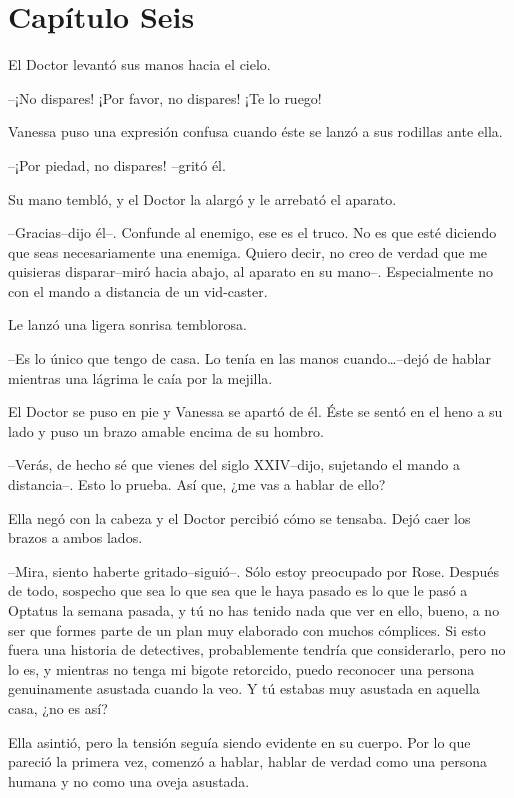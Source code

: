 \chapter*{Capítulo Seis}

El Doctor levantó sus manos hacia el cielo.

--¡No dispares! ¡Por favor, no dispares! ¡Te lo ruego!

Vanessa puso una expresión confusa cuando éste se lanzó a sus rodillas
ante ella.

--¡Por piedad, no dispares! --gritó él.

Su mano tembló, y el Doctor la alargó y le arrebató el aparato.

--Gracias--dijo él--. Confunde al enemigo, ese es el truco. No es que
esté diciendo que seas necesariamente una enemiga. Quiero decir, no creo
de verdad que me quisieras disparar--miró hacia abajo, al aparato en su
mano--. Especialmente no con el mando a distancia de un vid-caster.

Le lanzó una ligera sonrisa temblorosa.

--Es lo único que tengo de casa. Lo tenía en las manos
cuando\ldots{}--dejó de hablar mientras una lágrima le caía por la
mejilla.

El Doctor se puso en pie y Vanessa se apartó de él. Éste se sentó en el
heno a su lado y puso un brazo amable encima de su hombro.

--Verás, de hecho sé que vienes del siglo XXIV--dijo, sujetando el mando
a distancia--. Esto lo prueba. Así que, ¿me vas a hablar de ello?

Ella negó con la cabeza y el Doctor percibió cómo se tensaba. Dejó caer
los brazos a ambos lados.

--Mira, siento haberte gritado--siguió--. Sólo estoy preocupado por
Rose. Después de todo, sospecho que sea lo que sea que le haya pasado es
lo que le pasó a Optatus la semana pasada, y tú no has tenido nada que
ver en ello, bueno, a no ser que formes parte de un plan muy elaborado
con muchos cómplices. Si esto fuera una historia de detectives,
probablemente tendría que considerarlo, pero no lo es, y mientras no
tenga mi bigote retorcido, puedo reconocer una persona genuinamente
asustada cuando la veo. Y tú estabas muy asustada en aquella casa, ¿no
es así?

Ella asintió, pero la tensión seguía siendo evidente en su cuerpo. Por
lo que pareció la primera vez, comenzó a hablar, hablar de verdad como
una persona humana y no como una oveja asustada.

